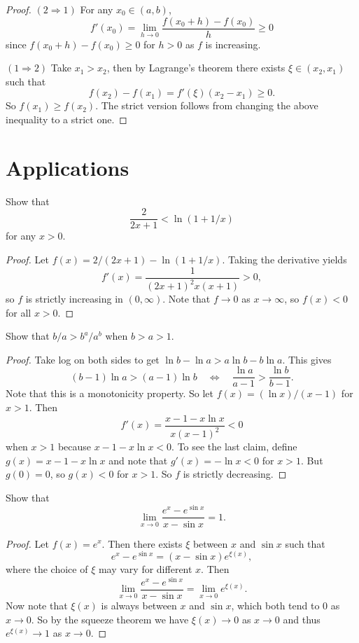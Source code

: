 \begin{proof}
  $(2 \Rightarrow 1)$ For any $x_0 \in (a, b)$,
  \[
    f'(x_0) = \lim_{h \to 0} \frac{f(x_0 + h) - f(x_0)}{h} \ge 0
  \]
  since $f(x_0 + h) - f(x_0) \ge 0$ for $h > 0$
  as $f$ is increasing.

  $(1 \Rightarrow 2)$ Take $x_1 > x_2$, then
  by Lagrange's theorem there exists $\xi \in (x_2, x_1)$
  such that
  \[f(x_2) - f(x_1) = f'(\xi)(x_2 - x_1) \ge 0.\]
  So $f(x_1) \ge f(x_2)$. The strict version follows
  from changing the above inequality to a strict one.
\end{proof}

\section{Applications}
\begin{example}
  Show that
  \[\frac{2}{2x + 1} < \ln(1 + 1 / x)\]
  for any $x > 0$.
\end{example}

\begin{proof}
  Let $f(x) = 2 / (2x + 1) - \ln(1 + 1 / x)$. Taking
  the derivative yields
  \[
    f'(x) = \frac{1}{(2x + 1)^2 x (x + 1)} > 0,
  \]
  so $f$ is strictly increasing in $(0, \infty)$.
  Note that $f \to 0$ as $x \to \infty$, so $f(x) < 0$
  for all $x > 0$.
\end{proof}

\begin{example}
  Show that $b / a > b^a / a^b$
  when $b > a > 1$.
\end{example}

\begin{proof}
  Take log on both sides to get
  $\ln b - \ln a > a \ln b - b \ln a$. This gives
  \[
    (b - 1)\ln a > (a - 1) \ln b
    \quad \iff \quad \frac{\ln a}{a - 1} > \frac{\ln b}{b - 1}.
  \]
  Note that this is a monotonicity property. So
  let $f(x) = (\ln x) / (x - 1)$ for $x > 1$. Then
  \[
    f'(x) = \frac{x - 1 - x\ln x}{x(x - 1)^2} < 0
  \]
  when $x > 1$ because $x - 1 - x \ln x < 0$. To see
  the last claim, define $g(x) = x - 1 - x \ln x$
  and note that $g'(x) = -\ln x < 0$ for $x > 1$.
  But $g(0) = 0$, so $g(x) < 0$ for $x > 1$. So $f$
  is strictly decreasing.
\end{proof}

\begin{example}
  Show that
  \[
    \lim_{x \to 0} \frac{e^x - e^{\sin x}}{x - \sin x} = 1.
  \]
\begin{proof}
  Let $f(x) = e^x$. Then there exists $\xi$ between
  $x$ and $\sin x$ such that
  \[
    e^x - e^{\sin x} = (x - \sin x) e^{\xi(x)},
  \]
  where the choice of $\xi$ may vary for different $x$.
  Then
  \[
    \lim_{x \to 0} \frac{e^x - e^{\sin x}}{x - \sin x} = 
    \lim_{x \to 0} e^{\xi(x)}.
  \]
  Now note that $\xi(x)$ is always between $x$ and
  $\sin x$, which both tend to $0$ as $x \to 0$. So by
  the squeeze theorem we have $\xi(x) \to 0$ as $x \to 0$
  and thus $e^{\xi(x)} \to 1$ as $x \to 0$.
\end{proof}
\end{example}

